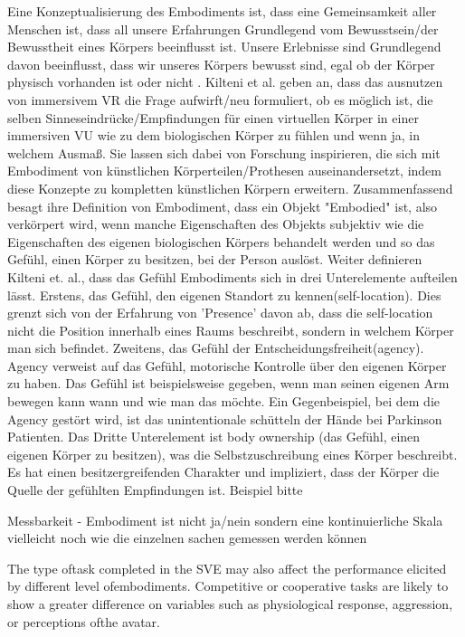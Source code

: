 Eine Konzeptualisierung des Embodiments ist, dass eine Gemeinsamkeit aller Menschen ist, dass all unsere Erfahrungen Grundlegend vom Bewusstsein/der Bewusstheit eines Körpers beeinflusst ist. Unsere Erlebnisse sind Grundlegend davon beeinflusst, dass wir unseres Körpers bewusst sind, egal ob der Körper physisch vorhanden ist oder nicht \cite{Tham2018}
. Kilteni et al. \cite{Kilteni2012} geben an, dass das ausnutzen von immersivem VR die Frage aufwirft/neu formuliert, ob es möglich ist, die selben Sinneseindrücke/Empfindungen für einen virtuellen Körper in einer immersiven VU wie zu dem biologischen Körper zu fühlen und wenn ja, in welchem Ausmaß. Sie lassen sich  dabei von Forschung inspirieren, die sich mit Embodiment von künstlichen Körperteilen/Prothesen auseinandersetzt, indem diese Konzepte zu kompletten künstlichen Körpern erweitern. Zusammenfassend besagt ihre Definition von Embodiment, dass ein Objekt "Embodied" ist, also verkörpert wird, wenn manche Eigenschaften des Objekts subjektiv wie die Eigenschaften des eigenen biologischen Körpers behandelt werden und so das Gefühl,  einen Körper zu besitzen,  bei der Person auslöst.
Weiter definieren Kilteni et. al., dass das Gefühl Embodiments sich in drei Unterelemente aufteilen lässt. Erstens, das Gefühl, den eigenen Standort zu kennen(self-location).  Dies grenzt sich von der Erfahrung von 'Presence' davon ab, dass die self-location nicht die Position innerhalb eines Raums beschreibt, sondern in welchem Körper man sich befindet. Zweitens, das Gefühl der Entscheidungsfreiheit(agency). Agency verweist auf das Gefühl, motorische Kontrolle über den eigenen Körper zu haben. Das Gefühl ist beispielsweise gegeben, wenn man seinen eigenen Arm bewegen kann wann und wie man das möchte. Ein Gegenbeispiel, bei dem die Agency gestört wird, ist das unintentionale schütteln der Hände bei  Parkinson Patienten. Das Dritte Unterelement ist body ownership (das Gefühl, einen eigenen Körper zu besitzen), was die Selbstzuschreibung eines Körper beschreibt. Es hat einen besitzergreifenden Charakter und impliziert, dass der Körper die Quelle der gefühlten Empfindungen ist. Beispiel bitte

Messbarkeit - Embodiment ist nicht ja/nein sondern eine kontinuierliche Skala
vielleicht noch wie die einzelnen sachen gemessen werden können
\cite{Kilteni2012}

The type oftask completed in the SVE may also affect the performance elicited by different level ofembodiments. Competitive or cooperative tasks are likely to show a greater difference on variables such as physiological response, aggression, or perceptions ofthe avatar. \cite{pan2017}

